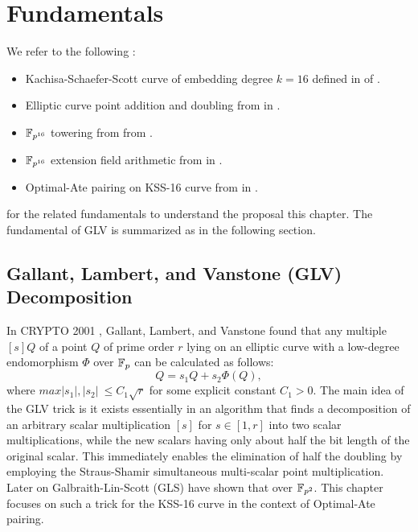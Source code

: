 \section{Fundamentals}
\label{sec:ch:candar18:fundamental}

We refer to the following :
\begin{itemize}
	\item Kachisa-Schaefer-Scott curve of embedding degree $k=16$ defined in   of .
	\item Elliptic curve point addition and doubling from  in .
	\item $\mathbb{F}_{p^{16}}$ towering from  from .
	\item $\mathbb{F}_{p^{16}}$ extension field arithmetic from  in .
	\item Optimal-Ate pairing on KSS-16 curve from  in .
\end{itemize}
for the related fundamentals to understand the proposal this chapter.
The fundamental of GLV is summarized as in the following section.

\subsection{Gallant, Lambert, and Vanstone (GLV) Decomposition}
In CRYPTO 2001 \cite{C:GalLamVan01}, Gallant, Lambert, and Vanstone found that any multiple $[s]Q$ of a point $Q$ of prime order $r$ lying on an elliptic curve with a low-degree endomorphism $\Phi$ over $\mathbb{F}_p$ can be calculated as follows:
\begin{equation}
    [s]Q = s_1 Q + s_2 \Phi(Q),  
\end{equation}
where $max{|s_1|,|s_2|}  ~\leq C_1 \sqrt{r}$ for some explicit constant $C_1 > 0$.
The main idea of the GLV trick is it exists essentially in an algorithm that finds a decomposition of an arbitrary scalar multiplication $[s]$ for $s \in  [1,r]$ into two scalar multiplications, while the new scalars having only about half the bit length of the original scalar.
This immediately enables the elimination of half the doubling by employing the Straus-Shamir simultaneous multi-scalar point multiplication. 
Later on Galbraith-Lin-Scott (GLS) have shown that over $\mathbb{F}_{p^2}$. 
This chapter focuses on such a trick for the KSS-16 curve in the context of Optimal-Ate pairing. 

